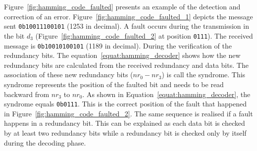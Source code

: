 Figure~\ref{fig:hamming_code_faulted} presents an example of the detection and correction of an error. Figure~\ref{fig:hamming_code_faulted_1} depicts the message sent \texttt{0b10011100101} (1253 in decimal). A fault occurs during the transmission in the bit $d_3$ (Figure~\ref{fig:hamming_code_faulted_2} at position \texttt{0111}). The received message is \texttt{0b10010100101} (1189 in decimal).
During the verification of the redundancy bits. The equation~\ref{equat:hamming_decoder} shows how the new redundancy bits are calculated from the received redundancy and data bits. The association of these new redundancy bits ($nr_{0}-nr_{3}$) is call the syndrome. This syndrome represents the position of the faulted bit and needs to be read backward from $nr_3$ to $nr_0$. As shown in Equation~\ref{equat:hamming_decoder}, the syndrome equals \texttt{0b0111}. This is the correct position of the fault that happened in Figure~\ref{fig:hamming_code_faulted_2}. The same sequence is realised if a fault happens in a redundancy bit. This can be explained as each data bit is checked by at least two redundancy bits while a redundancy bit is checked only by itself during the decoding phase.

